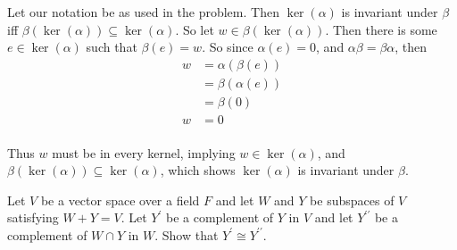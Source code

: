 \documentclass{article}
\begin{document}
\begin{solution}
Let our notation be as used in the problem. Then $\ker(\alpha)$ is invariant under $\beta$ iff $\beta(\ker(\alpha)) \subseteq \ker(\alpha)$. So let $w\in\beta(\ker(\alpha))$. Then there is some $e\in\ker(\alpha)$ such that $\beta(e)=w$. So since $\alpha(e)=0$, and $\alpha\beta = \beta\alpha$, then
\begin{align*}
w &= \alpha(\beta(e))\\
&= \beta(\alpha(e)) \\
&= \beta(0)\\
w &= 0
\end{align*}

\paragraph{}
Thus $w$ must be in every kernel, implying $w\in\ker(\alpha)$, and $\beta(\ker(\alpha)) \subseteq \ker(\alpha)$, which shows $\ker(\alpha)$ is invariant under $\beta$.
\end{solution}

\setcounter{problem}{384}
\begin{problem}
Let $V$ be a vector space over a field $F$ and let $W$ and $Y$ be subspaces of $V$ satisfying $W+Y=V$. Let $Y^{\prime}$ be a complement of $Y$ in $V$ and let $Y^{\prime\prime}$ be a complement of $W\cap Y$ in $W$. Show that $Y^{\prime} \cong Y^{\prime\prime}$.
\end{problem}
\end{document}
